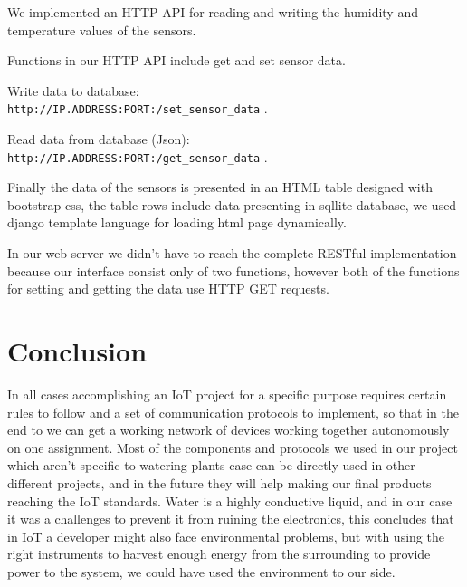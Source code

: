 \documentclass[11pt,paper=a4,parskip=half]{scrartcl}
\begin{document}
We implemented an HTTP API for reading and writing the humidity and temperature
values of the sensors.

Functions in our HTTP API include get and set sensor data.

Write data to database:
\\ \texttt{http://IP.ADDRESS:PORT:/set\_sensor\_data} .

Read data from database (Json):
\\ \texttt{http://IP.ADDRESS:PORT:/get\_sensor\_data} .

Finally the data of the sensors is presented in an HTML table designed with
bootstrap css, the table rows include data presenting in sqllite database, we
used django template language for loading html page dynamically.

In our web server we didn't have to reach the complete RESTful implementation
because our interface consist only of two functions, however both of the
functions for setting and getting the data use HTTP GET requests.

\section{Conclusion}

In all cases accomplishing an IoT project for a specific purpose requires
certain rules to follow and a set of communication protocols to implement, so
that in the end to we can get a working network of devices working together
autonomously on one assignment. Most of the components and protocols we used in
our project which aren't specific to watering plants case can be directly used
in other different projects, and in the future they will help making our final
products reaching the IoT standards. Water is a highly conductive liquid, and
in our case it was a challenges to prevent it from ruining the electronics,
this concludes that in IoT a developer might also face environmental problems,
but with using the right instruments to harvest enough energy from the
surrounding to provide power to the system, we could have used the environment
to our side.

\newpage
\nocite{*}


\end{document}
